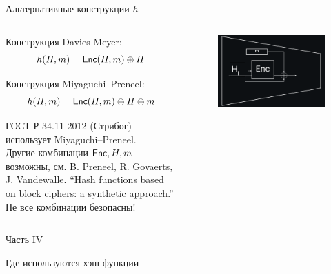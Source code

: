 \documentclass[usenames,dvipsnames,8pt,aspectratio=169]{beamer}
\begin{document}
\begin{frame}{Альтернативные конструкции $h$}
\Large
\begin{columns}[T]
\begin{column}{0.5\textwidth}
{\color{Orange} Конструкция Davies-Meyer:}
\[
h(H, m) = \textsf{Enc}(H, m)\oplus H
\]

{\color{Orange} Конструкция Miyaguchi–Preneel:}
\[
h(H, m) = \textsf{Enc}(H, m)\oplus H \oplus m
\]

\vspace{10pt}	
ГОСТ  Р 34.11-2012 (Стрибог) использует Miyaguchi–Preneel.\\[7pt]
Другие комбинации $\textsf{Enc}, H, m$ возможны, см. B. Preneel, R. Govaerts, J. Vandewalle. ``Hash functions based on block ciphers: a synthetic approach.''  \\[7pt]
Не все комбинации безопасны! \\[7pt]

\end{column}
\begin{column}{0.5\textwidth}
\begin{figure}
\includegraphics[width=\textwidth]{MiyaguchiPreneelCompression}

\vspace{30pt}	


\end{figure}
\end{column}
\end{columns}
\end{frame}

\begin{frame}
Часть IV \\ [10pt]
\begin{LARGE}
	
	\color{Orange}
	\Huge Где используются хэш-функции
	
\end{LARGE}
\end{frame}
\end{document}
